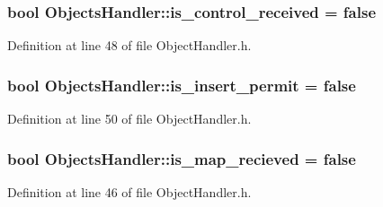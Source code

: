 \subsubsection[{\texorpdfstring{is\+\_\+control\+\_\+received}{is_control_received}}]{\setlength{\rightskip}{0pt plus 5cm}bool Objects\+Handler\+::is\+\_\+control\+\_\+received = false}\hypertarget{class_objects_handler_a88fb913340c535df81f3b7ae5f06df61}{}\label{class_objects_handler_a88fb913340c535df81f3b7ae5f06df61}


Definition at line 48 of file Object\+Handler.\+h.

\subsubsection[{\texorpdfstring{is\+\_\+insert\+\_\+permit}{is_insert_permit}}]{\setlength{\rightskip}{0pt plus 5cm}bool Objects\+Handler\+::is\+\_\+insert\+\_\+permit = false}\hypertarget{class_objects_handler_acaefe98eb412d4c32cda2bf0bd602ae7}{}\label{class_objects_handler_acaefe98eb412d4c32cda2bf0bd602ae7}


Definition at line 50 of file Object\+Handler.\+h.

\subsubsection[{\texorpdfstring{is\+\_\+map\+\_\+recieved}{is_map_recieved}}]{\setlength{\rightskip}{0pt plus 5cm}bool Objects\+Handler\+::is\+\_\+map\+\_\+recieved = false}\hypertarget{class_objects_handler_acf1ef1b318defc2a39d87cea72689478}{}\label{class_objects_handler_acf1ef1b318defc2a39d87cea72689478}


Definition at line 46 of file Object\+Handler.\+h.

